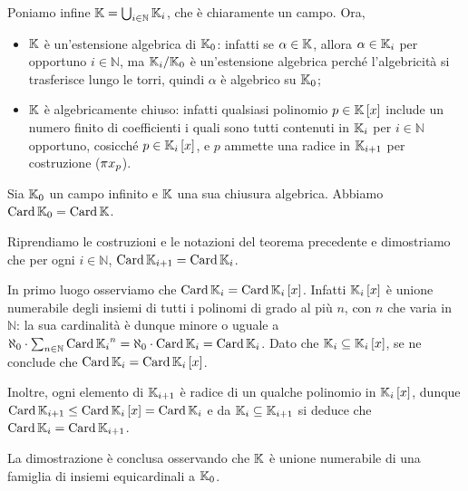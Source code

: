 \par Poniamo infine $\mathbb{K} = \bigcup_{i \in \mathbb{N}} \mathbb{K}_i$, che \`e chiaramente un campo. Ora,
\begin{itemize}
	\item $\mathbb{K}$ \`e un'estensione algebrica di $\mathbb{K}_0$: infatti se $\alpha \in \mathbb{K}$, allora $\alpha \in \mathbb{K}_i$ per opportuno $i \in \mathbb{N}$, ma $\mathbb{K}_i/\mathbb{K}_0$ \`e un'estensione algebrica perch\'e l'algebricit\`a si trasferisce lungo le torri, quindi $\alpha$ \`e algebrico su $\mathbb{K}_0$;
	\item $\mathbb{K}$ \`e algebricamente chiuso: infatti qualsiasi polinomio $p \in \mathbb{K} \left [ x \right ]$ include un numero finito di coefficienti i quali sono tutti contenuti in $\mathbb{K}_i$ per $i \in \mathbb{N}$ opportuno, cosicch\'e $p \in \mathbb{K}_i \left [ x \right ]$, e $p$ ammette una radice in $\mathbb{K}_{i + 1}$ per costruzione ($\Projection{x_p}$). \EndProof
\end{itemize}
\begin{Theorem}
	Sia $\mathbb{K}_0$ un campo infinito e $\mathbb{K}$ una sua chiusura algebrica. Abbiamo $\operatorname{Card}{\mathbb{K}_0} = \operatorname{Card}{\mathbb{K}}$.
\end{Theorem}
\Proof Riprendiamo le costruzioni e le notazioni del teorema precedente e dimostriamo che per ogni $i \in \mathbb{N}$, $\operatorname{Card}{\mathbb{K}_{i + 1}} = \operatorname{Card}{\mathbb{K}_i}$.
\par In primo luogo osserviamo che $\operatorname{Card}{\mathbb{K}_i} = \operatorname{Card}{\mathbb{K}_i \left [ x \right ]}$. Infatti $\mathbb{K}_i \left [ x \right ]$ \`e unione numerabile degli insiemi di tutti i polinomi di grado al pi\`u $n$, con $n$ che varia in $\mathbb{N}$: la sua cardinalit\`a \`e dunque minore o uguale a $\aleph_0 \cdot \sum_{n \in \mathbb{N}} \operatorname{Card}{\mathbb{K}_i}^n = \aleph_0 \cdot \operatorname{Card}{\mathbb{K}_i} = \operatorname{Card}{\mathbb{K}_i}$. Dato che $\mathbb{K}_i \subseteq \mathbb{K}_i \left [ x \right ]$, se ne conclude che $\operatorname{Card}{\mathbb{K}_i} = \operatorname{Card}{\mathbb{K}_i \left [ x \right ]}$.
\par Inoltre, ogni elemento di $\mathbb{K}_{i + 1}$ \`e radice di un qualche polinomio in $\mathbb{K}_i \left [ x \right ]$, dunque $\operatorname{Card}{\mathbb{K}_{i + 1}} \leq \operatorname{Card}{\mathbb{K}_i \left [ x \right ]} = \operatorname{Card}{\mathbb{K}_i}$ e da $\mathbb{K}_i \subseteq \mathbb{K}_{i + 1}$ si deduce che $\operatorname{Card}{\mathbb{K}_i} = \operatorname{Card}{\mathbb{K}_{i + 1}}$.
\par La dimostrazione \`e conclusa osservando che $\mathbb{K}$ \`e unione numerabile di una famiglia di insiemi equicardinali a $\mathbb{K}_0$. \EndProof
